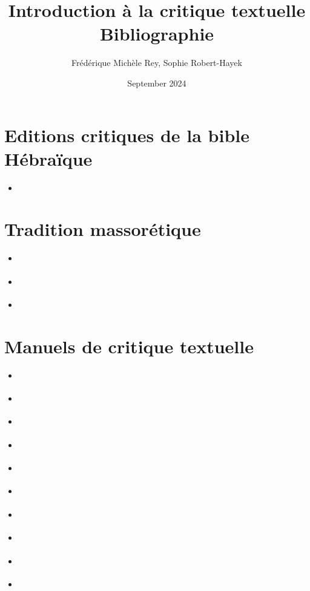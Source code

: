 \documentclass[11pt,a4paper]{article}
\title{Introduction à la critique textuelle\\
Bibliographie}
\author{Frédérique Michèle Rey, Sophie Robert-Hayek}
\date{September 2024}
\begin{document}
\maketitle
\justifying

\section{Editions critiques de la bible Hébraïque}
\begin{itemize}
    \item \cite{elliger_biblia_2007}
    
\end{itemize}

\section{Tradition massorétique}
\begin{itemize}
    \item \cite{ginsburg_introduction_1897}
    \item \cite{weil_massorah_1971}
    \item \cite{yeivin_introduction_1980}
\end{itemize}

\section{Manuels de critique textuelle}
\begin{itemize}
    \item \cite{tov_textual_2012}
    \item \cite{waard_biblia_2020}
    \item \cite{romer_guide_2006}
    \item \cite{brotzman_old_2016}
    \item \cite{payne_old_1974}
    \item \cite{barthelemy_critique_1982}
    \item \cite{barthelemy_critique_1986}
    \item \cite{barthelemy_critique_1992}
    \item \cite{barthelemy_critique_2005}
    \item \cite{barthelemy_critique_2015}
\end{itemize}
\end{document}
